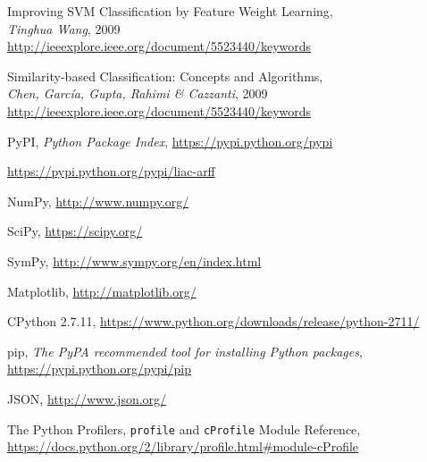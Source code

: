\documentclass[11pt]{article}
\theoremstyle{plain}
\theoremstyle{definition}
\begin{document}
\begin{thebibliography}{99}
  Improving SVM Classification by Feature Weight Learning, \\
  \textit{Tinghua Wang}, 2009 \\
  \url{http://ieeexplore.ieee.org/document/5523440/keywords}

  Similarity-based Classification: Concepts and Algorithms, \\
  \textit{Chen, García, Gupta, Rahimi \& Cazzanti}, 2009 \\
  \url{http://ieeexplore.ieee.org/document/5523440/keywords}

  PyPI, \textit{Python Package Index},
  \url{https://pypi.python.org/pypi}

  \url{https://pypi.python.org/pypi/liac-arff}

  NumPy,
  \url{http://www.numpy.org/}

  SciPy,
  \url{https://scipy.org/}

  SymPy,
  \url{http://www.sympy.org/en/index.html}

  Matplotlib,
  \url{http://matplotlib.org/}

  CPython 2.7.11,
  \url{https://www.python.org/downloads/release/python-2711/}

  pip, \textit{The PyPA recommended tool for installing Python packages},
  \url{https://pypi.python.org/pypi/pip}

  JSON,
  \url{http://www.json.org/}

  The Python Profilers, \texttt{profile} and \texttt{cProfile} Module Reference,
  \url{https://docs.python.org/2/library/profile.html#module-cProfile}
\end{thebibliography}
\end{document}
